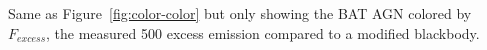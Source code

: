 \label{fig:color-color_excess} Same as Figure~\ref{fig:color-color} but only showing the BAT AGN colored by $F_{excess}$, the measured 500 \um{} excess emission compared to a modified blackbody.
  